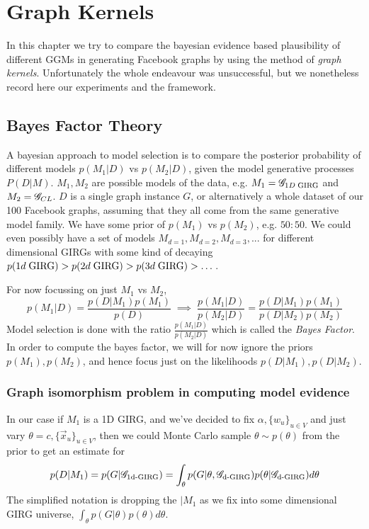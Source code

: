 \chapter{Graph Kernels}
\label{chap:graph_kernels}
\minitoc

In this chapter we try to compare the bayesian evidence based plausibility of different GGMs in generating Facebook graphs by using the method of \textit{graph kernels}. Unfortunately the whole endeavour was unsuccessful, but we nonetheless record here our experiments and the framework.

\section{Bayes Factor Theory}
A bayesian approach to model selection is to compare the posterior probability of different models $p(M_1 | D)$ vs $p(M_2 | D)$, given the model generative processes $P(D | M)$. 
$M_1, M_2$ are possible models of the data, e.g. $M_1 = \mathscr{G}_{1D\; \mathrm{GIRG}}$ and $M_2 = \mathscr{G}_{CL}$.
$D$ is a single graph instance $G$, or alternatively a whole dataset of our 100 Facebook graphs, assuming that they all come from the same generative model family.
We have some prior of $p(M_1)$ vs $p(M_2)$, e.g. $50 : 50$. We could even possibly have a set of models $M_{d=1}, M_{d=2}, M_{d=3}, ...$ for different dimensional GIRGs with some kind of decaying $p(1d\; \mathrm{GIRG}) > p(2d\; \mathrm{GIRG}) > p(3d\; \mathrm{GIRG}) > \dots$.

For now focussing on just $M_1$ vs $M_2$,
\begin{equation}
  p(M_1 | D) = \frac{p(D | M_1) p(M_1)}{p(D)} 
  \;
  \implies
  \;
  \frac{p(M_1 | D)}{p(M_2 | D)} = \frac{p(D | M_1) p(M_1)}{p(D | M_2) p(M_2)}
\end{equation}
Model selection is done with the ratio $\frac{p(M_1 | D)}{p(M_2 | D)}$ which is called the \textit{Bayes Factor}.
In order to compute the bayes factor, we will for now ignore the priors $p(M_1), p(M_2)$, and hence focus just on the likelihoods $p(D | M_1), p(D | M_2)$.



\subsection{Graph isomorphism problem in computing model evidence}
In our case if $M_1$ is a 1D GIRG, and we've decided to fix 
$\alpha, \{w_u\}_{u \in V}$
 and just vary $\theta = c, \{\vec{x}_u\}_{u \in V}$, then we could Monte Carlo sample $\theta \sim p(\theta)$ from the prior to get an estimate for
\begin{equation} \label{eq:incorrect_girg_model_likelihood}
  p(D| M_1) = p(G | \mathscr{G}_{\text{1d-}\mathrm{GIRG}}) = \int_\theta p(G | \theta, \mathscr{G}_{\text{d-}\mathrm{GIRG}}) p(\theta | \mathscr{G}_{\text{d-}\mathrm{GIRG}}) d\theta
\end{equation}
The simplified notation is dropping the $| M_1$ as we fix into some dimensional GIRG universe, $\int_\theta p(G | \theta) p(\theta) d\theta$.

